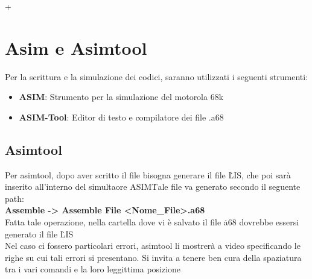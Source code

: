 +\section{Asim e Asimtool}
Per la scrittura e la simulazione dei codici, saranno utilizzati i seguenti strumenti:
\begin{itemize}
    \item \textbf{ASIM}: Strumento per la simulazione del motorola 68k
    \item \textbf{ASIM-Tool}: Editor di testo e compilatore dei file .a68
\end{itemize}

\subsection{Asimtool}

Per asimtool, dopo aver scritto il file bisogna generare il file \.LIS, che poi sarà inserito all'interno del simultaore ASIM\. Tale file va generato secondo il seguente path: 
\\
\textbf{Assemble -> Assemble File <Nome\_File>.a68}
\\
Fatta tale operazione, nella cartella dove vi è salvato il file \.a68 dovrebbe essersi generato il file \.LIS
\\
Nel caso ci fossero particolari errori, asimtool li mostrerà a video specificando le righe su cui tali errori si presentano. Si invita a tenere ben cura della spaziatura tra i vari comandi e la loro leggittima posizione


